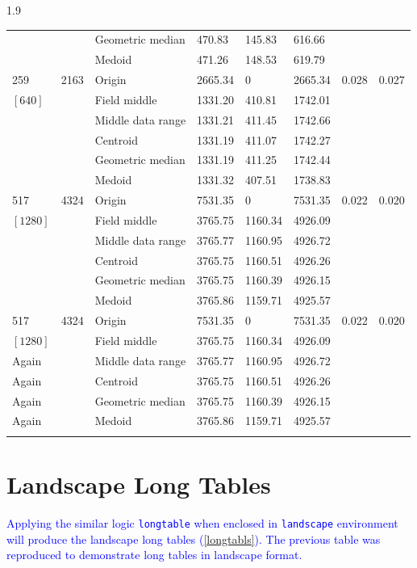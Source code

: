 \documentclass[phd]{ndsu-thesis-2022}
\newcommand\myspacing{1.9} %
\newcommand\italk[1]{\textcolor{blue}{#1}}  %
\begin{document}
\begin{spacing}{\myspacing}
{{\begin{ThreePartTable}
\begin{longtable}{lll lll ll}
 &  & Geometric median & 470.83 & 145.83 & 616.66 \\
 &  & Medoid  & 471.26 & 148.53 & 619.79 \\
\midrule
259 & 2163 & Origin  & 2665.34 & 0 & 2665.34 & 0.028 & 0.027 \\
$[640]$ &  & Field middle  & 1331.20 & 410.81 & 1742.01 \\
 &  & Middle data range  & 1331.21 & 411.45 & 1742.66 \\
 &  & Centroid & 1331.19 & 411.07 & 1742.27 \\
 &  & Geometric median & 1331.19 & 411.25 & 1742.44 \\
 &  & Medoid  & 1331.32 & 407.51 & 1738.83 \\
\midrule
517 & 4324 & Origin  & 7531.35 & 0 & 7531.35 & 0.022 & 0.020 \\
$[1280]$ &  & Field middle  & 3765.75 & 1160.34 & 4926.09 \\
 &  & Middle data range  & 3765.77 & 1160.95 & 4926.72 \\
 &  & Centroid & 3765.75 & 1160.51 & 4926.26 \\
 &  & Geometric median & 3765.75 & 1160.39 & 4926.15 \\
 &  & Medoid  & 3765.86 & 1159.71 & 4925.57 \\
\midrule
517 & 4324 & Origin  & 7531.35 & 0 & 7531.35 & 0.022 & 0.020 \\
$[1280]$ &  & Field middle  & 3765.75 & 1160.34 & 4926.09 \\
 Again &  & Middle data range  & 3765.77 & 1160.95 & 4926.72 \\
 Again &  & Centroid & 3765.75 & 1160.51 & 4926.26 \\
 Again &  & Geometric median & 3765.75 & 1160.39 & 4926.15 \\
 Again &  & Medoid  & 3765.86 & 1159.71 & 4925.57 \\
 \label{longtab} %
\end{longtable} 
\end{ThreePartTable}
}
}
\setlength{\parindent}{0.5in}
\vspace{-2ex}
\kant[1]


\section{Landscape Long Tables}
\italk{Applying the similar logic \texttt{longtable} when enclosed in \texttt{landscape} environment will produce the landscape long tables (\cref{longtabls}). The previous table was reproduced to demonstrate long tables in landscape format.}



\end{spacing}
\end{document}
